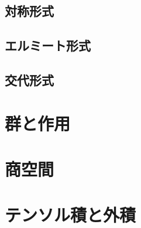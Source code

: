 \documentclass[uplatex, 12pt, dvipdfmx]{jsreport}
\begin{document}
\section{対称形式}

\section{エルミート形式}

\section{交代形式}

\chapter{群と作用}

\chapter{商空間}

\chapter{テンソル積と外積}
\end{document}
